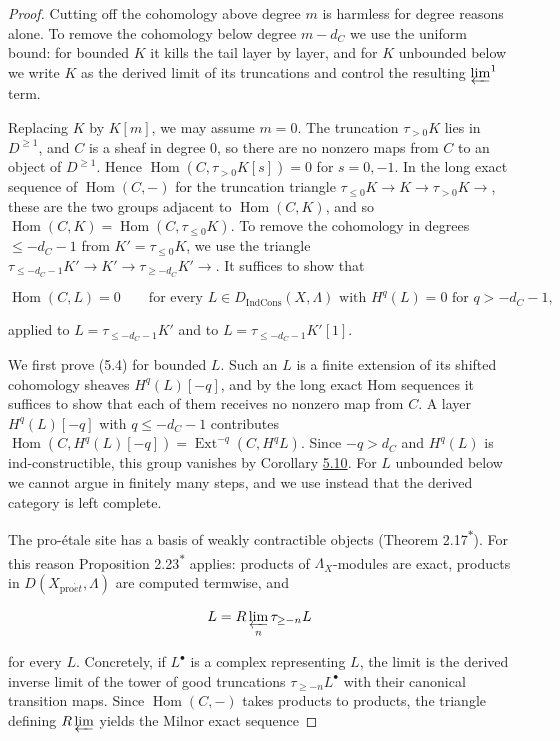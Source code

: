 \documentclass[11pt]{article}
\newcommand{\bpout}[1]{#1\textsuperscript{\hyperlink{bp-outside}{\ensuremath{\ast}}}}
\providecommand{\Dic}{}\renewcommand{\Dic}{D_{\IndCons}}
\providecommand{\Ext}{}\renewcommand{\Ext}{\operatorname{Ext}}
\providecommand{\Hom}{}\renewcommand{\Hom}{\operatorname{Hom}}
\providecommand{\IndCons}{}\renewcommand{\IndCons}{\operatorname{IndCons}}
\begin{document}
\begin{proof}[{Proof}]\label{bp38}%
Cutting off the cohomology above degree \(m\) is harmless for degree reasons alone. To remove the cohomology below degree \(m-d_C\) we use the uniform bound: for bounded \(K\) it kills the tail layer by layer, and for \(K\) unbounded below we write \(K\) as the derived limit of its truncations and control the resulting \(\varprojlim^1\) term.

Replacing \(K\) by \(K[m]\), we may assume \(m=0\). The truncation \(\tau_{>0}K\) lies in \(D^{\geq1}\), and \(C\) is a sheaf in degree \(0\), so there are no nonzero maps from \(C\) to an object of \(D^{\geq1}\). Hence \(\Hom(C,\tau_{>0}K[s])=0\) for \(s=0,-1\). In the long exact sequence of \(\Hom(C,-)\) for the truncation triangle \(\tau_{\leq0}K\to K\to\tau_{>0}K\to\), these are the two groups adjacent to \(\Hom(C,K)\), and so \(\Hom(C,K)=\Hom(C,\tau_{\leq0}K)\). To remove the cohomology in degrees \(\leq-d_C-1\) from \(K'=\tau_{\leq0}K\), we use the triangle \(\tau_{\leq-d_C-1}K'\to K'\to\tau_{\geq-d_C}K'\to\). It suffices to show that

\[
\Hom(C,L)=0\qquad
\text{for every }L\in\Dic(X,\Lambda)\text{ with }H^q(L)=0\text{ for }q>-d_C-1,
\tag{5.4}
\]

applied to \(L=\tau_{\leq-d_C-1}K'\) and to \(L=\tau_{\leq-d_C-1}K'[1]\).

We first prove (5.4) for bounded \(L\). Such an \(L\) is a finite extension of its shifted cohomology sheaves \(H^q(L)[-q]\), and by the long exact Hom sequences it suffices to show that each of them receives no nonzero map from \(C\). A layer \(H^q(L)[-q]\) with \(q\leq-d_C-1\) contributes \(\Hom(C,H^q(L)[-q])=\Ext^{-q}(C,H^qL)\). Since \(-q>d_C\) and \(H^q(L)\) is ind-constructible, this group vanishes by Corollary \hyperref[bp30]{5.10}. For \(L\) unbounded below we cannot argue in finitely many steps, and we use instead that the derived category is left complete.

The pro-étale site has a basis of weakly contractible objects (Theorem \bpout{2.17}). For this reason Proposition \bpout{2.23} applies: products of \(\Lambda_X\)-modules are exact, products in \(D(X_{\mathrm{pro}\acute{e}t},\Lambda)\) are computed termwise, and

\[
L=R\varprojlim_n\tau_{\geq-n}L
\]

for every \(L\). Concretely, if \(L^\bullet\) is a complex representing \(L\), the limit is the derived inverse limit of the tower of good truncations \(\tau_{\geq-n}L^\bullet\) with their canonical transition maps. Since \(\Hom(C,-)\) takes products to products, the triangle defining \(R\varprojlim\) yields the Milnor exact sequence


\end{proof}
\end{document}
